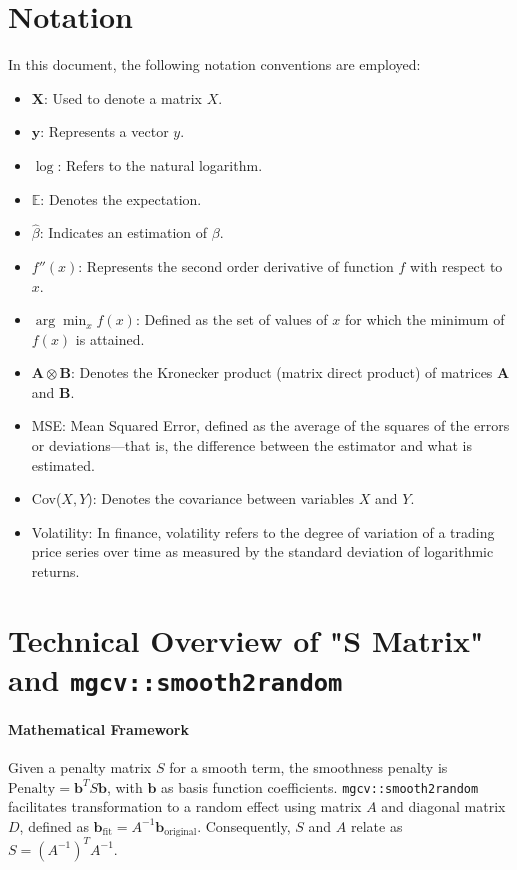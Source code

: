 \documentclass[12pt, twoside,hidelinks]{article}
\theoremstyle{definition}
\numberwithin{equation}{section}
\begin{document}
\FloatBarrier %

\appendix

\section{Notation}

In this document, the following notation conventions are employed:

\begin{itemize}
    \item \(\mathbf{X}\): Used to denote a matrix \(X\).
    \item \(\boldsymbol{y}\): Represents a vector \(y\).
    \item \(\log\): Refers to the natural logarithm.
    \item \(\mathbb{E}\): Denotes the expectation.
    \item \(\hat{\beta}\): Indicates an estimation of \(\beta\).
    \item \(f''(x)\): Represents the second order derivative of function \(f\) with respect to \(x\).
    \item \(\arg\min_{x} f(x)\): Defined as the set of values of \(x\) for which the minimum of \(f(x)\) is attained.
    \item \(\mathbf{A} \otimes \mathbf{B}\): Denotes the Kronecker product (matrix direct product) of matrices \(\mathbf{A}\) and \(\mathbf{B}\).
    \item MSE: Mean Squared Error, defined as the average of the squares of the errors or deviations—that is, the difference between the estimator and what is estimated.
    \item Cov(\(X, Y\)): Denotes the covariance between variables \(X\) and \(Y\).
    \item Volatility: In finance, volatility refers to the degree of variation of a trading price series over time as measured by the standard deviation of logarithmic returns.
\end{itemize}



\section{Technical Overview of "S Matrix" and \texttt{mgcv::smooth2random}}

\paragraph{Mathematical Framework}
Given a penalty matrix \( S \) for a smooth term, the smoothness penalty is \(\text{Penalty} = \mathbf{b}^T S \mathbf{b}\), with \( \mathbf{b} \) as basis function coefficients. \texttt{mgcv::smooth2random} facilitates transformation to a random effect using matrix \( A \) and diagonal matrix \( D \), defined as \(\mathbf{b}_{\text{fit}} = A^{-1} \mathbf{b}_{\text{original}}\). Consequently, \( S \) and \( A \) relate as \( S = (A^{-1})^T A^{-1} \).
\end{document}
